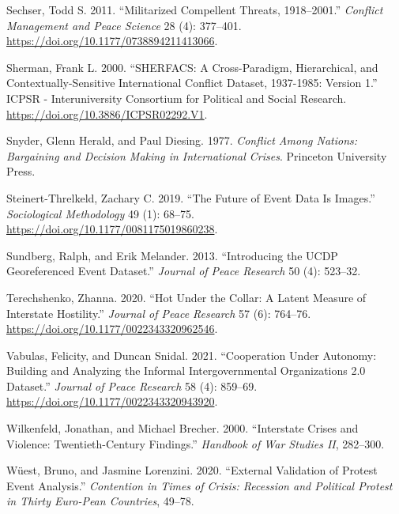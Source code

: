\documentclass{article}
\newlength{\cslhangindent}
\newlength{\cslentryspacingunit} %
\newenvironment{CSLReferences}[2] %
 {%
  \setlength{\parindent}{0pt}
  \ifodd #1
  \let\oldpar\par
  \def\par{\hangindent=\cslhangindent\oldpar}
  \fi
  \setlength{\parskip}{#2\cslentryspacingunit}
 }%
 {}
\begin{document}
\begin{CSLReferences}{1}{0}
\leavevmode{}%
Sechser, Todd S. 2011. {``Militarized {Compellent Threats},
1918--2001.''} \emph{Conflict Management and Peace Science} 28 (4):
377--401. \url{https://doi.org/10.1177/0738894211413066}.

\leavevmode{}%
Sherman, Frank L. 2000. {``{SHERFACS}: {A Cross-Paradigm},
{Hierarchical}, and {Contextually-Sensitive International Conflict
Dataset}, 1937-1985: {Version} 1.''} {ICPSR - Interuniversity Consortium
for Political and Social Research}.
\url{https://doi.org/10.3886/ICPSR02292.V1}.

\leavevmode{}%
Snyder, Glenn Herald, and Paul Diesing. 1977. \emph{Conflict Among
Nations: {Bargaining} and Decision Making in International Crises}.
{Princeton University Press}.

\leavevmode{}%
Steinert-Threlkeld, Zachary C. 2019. {``The {Future} of {Event Data Is
Images}.''} \emph{Sociological Methodology} 49 (1): 68--75.
\url{https://doi.org/10.1177/0081175019860238}.

\leavevmode{}%
Sundberg, Ralph, and Erik Melander. 2013. {``Introducing the {UCDP}
Georeferenced Event Dataset.''} \emph{Journal of Peace Research} 50 (4):
523--32.

\leavevmode{}%
Terechshenko, Zhanna. 2020. {``Hot Under the Collar: {A} Latent Measure
of Interstate Hostility.''} \emph{Journal of Peace Research} 57 (6):
764--76. \url{https://doi.org/10.1177/0022343320962546}.

\leavevmode{}%
Vabulas, Felicity, and Duncan Snidal. 2021. {``Cooperation Under
Autonomy: {Building} and Analyzing the {Informal Intergovernmental
Organizations} 2.0 Dataset.''} \emph{Journal of Peace Research} 58 (4):
859--69. \url{https://doi.org/10.1177/0022343320943920}.

\leavevmode{}%
Wilkenfeld, Jonathan, and Michael Brecher. 2000. {``Interstate Crises
and Violence: Twentieth-Century Findings.''} \emph{Handbook of War
Studies II}, 282--300.

\leavevmode{}%
Wüest, Bruno, and Jasmine Lorenzini. 2020. {``External Validation of
Protest Event Analysis.''} \emph{Contention in Times of Crisis:
Recession and Political Protest in Thirty Euro-Pean Countries}, 49--78.


\end{CSLReferences}
\end{document}
